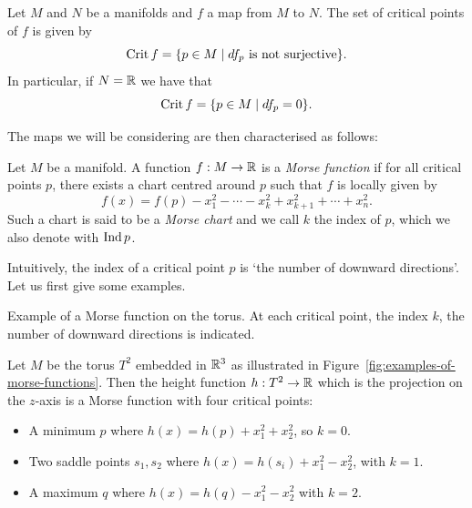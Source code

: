 \begin{definition}
    Let $M$ and $N$ be a manifolds and  $f$ a map from $M$ to $N$.
    The set of critical points of $f$ is given by
    \[
    \operatorname{Crit} f = \{p \in M  \mid \text{$df_p$ is not surjective}\} 
    .\] 
    In particular, if $N = \mathbb{R}$ we have that
    \[
    \operatorname{Crit} f = \{ p \in M  \mid  df_p = 0\} 
    .\] 
\end{definition}
The maps we will be considering are then characterised as follows:
\begin{definition}
    Let $M$ be a manifold. A function $f: M \to  \mathbb{R}$ is a \emph{Morse function} if for all critical points $p$, there exists a chart centred around $p$ such that $f$ is locally given by
    \[
        f(x) = f(p) -x_1^2 - \cdots - x_k^2 + x_{k+1}^2 + \cdots + x_n^2
    .\] 
    Such a chart is said to be a \emph{Morse chart} and we call $k$ the index of $p$, which we also denote with $\operatorname{Ind} p$.
    
\end{definition}
Intuitively, the index of a critical point $p$ is `the number of downward directions'.
Let us first give some examples.
\begin{marginfigure}
    \centering
    \caption{Example of a Morse function on the torus. At each critical point, the index $k$, the number of downward directions is indicated. }
    \label{fig:examples-of-morse-functions}
\end{marginfigure}
\begin{eg}
    Let $M$ be the torus  $T^2$ embedded in $\mathbb{R}^3$ as illustrated in Figure~\ref{fig:examples-of-morse-functions}.
    Then the height function $h: T^2 \to  \mathbb{R}$ which is the projection on the $z$-axis is a Morse function with four critical points:
    \begin{itemize}
        \item A minimum $p$ where $h(x) = h(p) + x_1^2 + x_2^2$, so $k = 0$.
        \item Two saddle points $s_1, s_2$ where $h(x) = h(s_i) + x_1^2 - x_2^2$, with $k=1$.
        \item A maximum $q$ where $h(x) = h(q) - x_1^2 - x_2^2$ with $k=2$.
    \end{itemize}
\end{eg}

